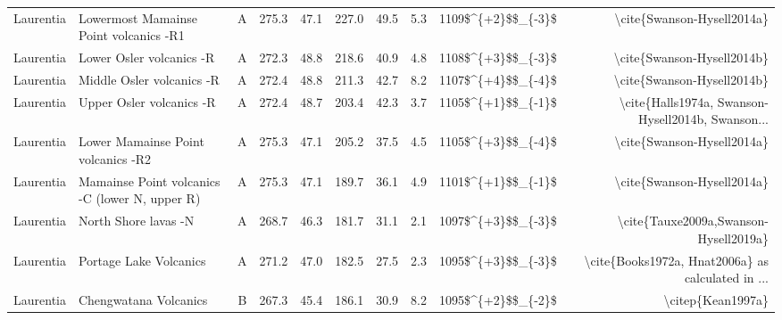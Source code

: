 \begin{longtable}{p{1 in}p{1 in}rrrrrrrr}
                     Laurentia &           Lowermost Mamainse Point volcanics -R1 &      A &     275.3 &      47.1 & 227.0 &  49.5 &       5.3 &     1109\$\textasciicircum \{+2\}\$\$\_\{-3\}\$ &                         \textbackslash cite\{Swanson-Hysell2014a\} \\
                     Laurentia &                         Lower Osler volcanics -R &      A &     272.3 &      48.8 & 218.6 &  40.9 &       4.8 &     1108\$\textasciicircum \{+3\}\$\$\_\{-3\}\$ &                         \textbackslash cite\{Swanson-Hysell2014b\} \\
                     Laurentia &                        Middle Osler volcanics -R &      A &     272.4 &      48.8 & 211.3 &  42.7 &       8.2 &     1107\$\textasciicircum \{+4\}\$\$\_\{-4\}\$ &                         \textbackslash cite\{Swanson-Hysell2014b\} \\
                     Laurentia &                         Upper Osler volcanics -R &      A &     272.4 &      48.7 & 203.4 &  42.3 &       3.7 &     1105\$\textasciicircum \{+1\}\$\$\_\{-1\}\$ &  \textbackslash cite\{Halls1974a, Swanson-Hysell2014b, Swanson... \\
                     Laurentia &               Lower Mamainse Point volcanics -R2 &      A &     275.3 &      47.1 & 205.2 &  37.5 &       4.5 &     1105\$\textasciicircum \{+3\}\$\$\_\{-4\}\$ &                         \textbackslash cite\{Swanson-Hysell2014a\} \\
                     Laurentia &   Mamainse Point volcanics -C (lower N, upper R) &      A &     275.3 &      47.1 & 189.7 &  36.1 &       4.9 &     1101\$\textasciicircum \{+1\}\$\$\_\{-1\}\$ &                         \textbackslash cite\{Swanson-Hysell2014a\} \\
                     Laurentia &                             North Shore lavas -N &      A &     268.7 &      46.3 & 181.7 &  31.1 &       2.1 &     1097\$\textasciicircum \{+3\}\$\$\_\{-3\}\$ &              \textbackslash cite\{Tauxe2009a,Swanson-Hysell2019a\} \\
                     Laurentia &                           Portage Lake Volcanics &      A &     271.2 &      47.0 & 182.5 &  27.5 &       2.3 &     1095\$\textasciicircum \{+3\}\$\$\_\{-3\}\$ &  \textbackslash cite\{Books1972a, Hnat2006a\} as calculated in ... \\
                     Laurentia &                            Chengwatana Volcanics &      B &     267.3 &      45.4 & 186.1 &  30.9 &       8.2 &     1095\$\textasciicircum \{+2\}\$\$\_\{-2\}\$ &                                  \textbackslash citep\{Kean1997a\} \\

\end{longtable}
